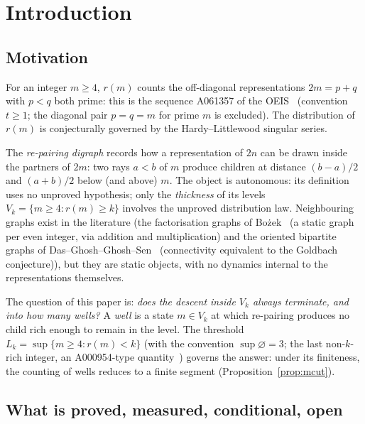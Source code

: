 \documentclass[11pt]{article}
\theoremstyle{plain}
\theoremstyle{definition}
\newcommand{\rch}{r}
\newcommand{\Vk}{V_{k}}
\begin{document}
\section{Introduction}

\subsection{Motivation}

For an integer $m \ge 4$, $\rch(m)$ counts the off-diagonal
representations $2m = p+q$ with $p < q$ both prime: this is the
sequence A061357 of the OEIS~\cite{oeis} (convention $t \ge 1$; the
diagonal pair $p = q = m$ for prime $m$ is excluded). The
distribution of $\rch(m)$ is conjecturally governed by the
Hardy--Littlewood singular series.

The \emph{re-pairing digraph} records how a representation of $2n$
can be drawn inside the partners of $2m$: two rays $a < b$ of $m$
produce children at distance $(b-a)/2$ and $(a+b)/2$ below (and
above) $m$. The object is autonomous: its definition uses no
unproved hypothesis; only the \emph{thickness} of its levels
$\Vk = \{m \ge 4 : \rch(m) \ge k\}$ involves the unproved
distribution law. Neighbouring graphs exist in the literature (the
factorisation graphs of Bo\.zek~\cite{bozek} (a static graph per
even integer, via addition and multiplication) and the oriented
bipartite graphs of Das--Ghosh--Ghosh--Sen~\cite{das} (connectivity
equivalent to the Goldbach conjecture)), but they are static
objects, with no dynamics internal to the representations
themselves.

The question of this paper is: \emph{does the descent inside $\Vk$
always terminate, and into how many wells?} A \emph{well} is a state
$m \in \Vk$ at which re-pairing produces no child rich enough to
remain in the level. The threshold
$L_k = \sup\{m \ge 4 : \rch(m) < k\}$ (with the convention
$\sup\varnothing = 3$; the last non-$k$-rich integer, an
A000954-type quantity~\cite{oeis}) governs the answer: under its
finiteness, the counting of wells reduces to a finite segment
(Proposition~\ref{prop:mcut}).

\subsection{What is proved, measured, conditional, open}
\label{sec:honest}
\end{document}
